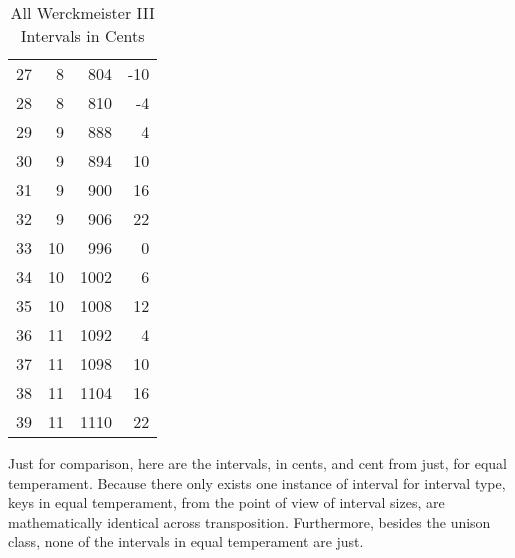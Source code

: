\begin{singlespace}
\begin{table}[H]
\begin{tabular}{|lrrr|}
27 &          8 &    804 &              -10 \\
28 &          8 &    810 &               -4 \\
29 &          9 &    888 &                4 \\
30 &          9 &    894 &               10 \\
31 &          9 &    900 &               16 \\
32 &          9 &    906 &               22 \\
33 &         10 &    996 &                0 \\
34 &         10 &   1002 &                6 \\
35 &         10 &   1008 &               12 \\
36 &         11 &   1092 &                4 \\
37 &         11 &   1098 &               10 \\
38 &         11 &   1104 &               16 \\
39 &         11 &   1110 &               22 \\
\hline
\end{tabular}
\caption{All Werckmeister III Intervals in Cents }
\end{table}
\normalsize
\end{singlespace}
    Just for comparison, here are the intervals, in cents, and cent from
just, for equal temperament. Because there only exists one instance of
interval for interval type, keys in equal temperament, from the point of
view of interval sizes, are mathematically identical across
transposition. Furthermore, besides the unison class, none of the
intervals in equal temperament are just.


